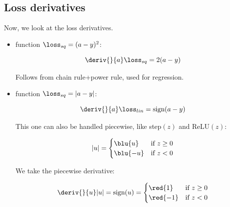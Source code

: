     \phantom{}
    
    \subsection{Loss derivatives}
    
        Now, we look at the loss derivatives.
        
        \begin{itemize}
            \item {} function $\loss_{sq} = (a-y)^2$:
            
                \begin{equation}
                    \deriv{}{a} \loss_{sq} = 2(a-y)
                \end{equation}
                
                Follows from chain rule+power rule, used for regression.
                
            \item {} function $\loss_{sq} = |a-y|$:
            
                \begin{equation}
                    \deriv{}{a} \loss_{lin} = \text{sign}(a-y)
                \end{equation}
                
                This one can also be handled piecewise, like step$(z)$ and ReLU$(z)$:
                
                \begin{equation}
                    |u| 
                    =
                    \begin{cases}
                      \blu{u} & \text{if $z \geq 0$}\\
                      \blu{-u} & \text{if $z < 0$}
                    \end{cases}
                \end{equation}
                
                We take the piecewise derivative:
                
                \begin{equation}
                    \deriv{}{u}
                    |u|
                    =
                    \text{sign}(u) 
                    =
                    \begin{cases}
                      \red{1} & \text{if $z \geq 0$}\\
                      \red{-1} & \text{if $z < 0$}
                    \end{cases}
                \end{equation}
                

\end{itemize}
